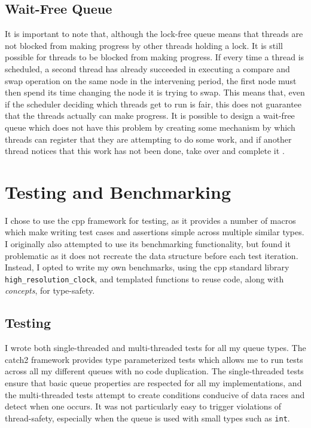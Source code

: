 \documentclass{article}
\begin{document}
\subsection{Wait-Free Queue}
It is important to note that, although the lock-free queue means that threads
are not blocked from making progress by other threads holding a lock. It is
still possible for threads to be blocked from making progress. If every time a
thread is scheduled, a second thread has already succeeded in executing a compare
and swap operation on the same node in the intervening period, the first node
must then spend its time changing the node it is trying to swap. This means
that, even if the scheduler deciding which threads get to run is fair, this does not
guarantee that the threads actually can make progress. It is possible to design
a wait-free queue which does not have this problem by creating some mechanism
by which threads can register that they are attempting to do some work, and if
another thread notices that this work has not been done, take over and complete
it \citep{kogan2011wait}.

\section{Testing and Benchmarking}
I chose to use the cpp \cite{catch2} framework for testing, as it provides a
number of macros which make writing test cases and assertions simple across
multiple similar types. I originally also attempted to use its benchmarking
functionality, but found it problematic as it does not recreate the data
structure before each test iteration. Instead, I opted to write my own
benchmarks, using the cpp standard library \verb|high_resolution_clock|, and
templated functions to reuse code, along with \textit{concepts}, for
type-safety.

\subsection{Testing}
I wrote both single-threaded and multi-threaded tests for all my queue types.
The catch2 framework provides type parameterized tests which allows me to run
tests across all my different queues with no code duplication. The
single-threaded tests ensure that basic queue properties are respected for all
my implementations, and the multi-threaded tests attempt to create conditions
conducive of data races and detect when one occurs. It was not particularly
easy to trigger violations of thread-safety, especially when the queue is used
with small types such as \verb|int|.
\end{document}
